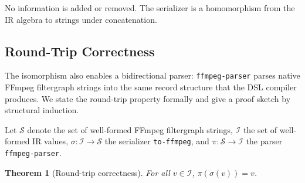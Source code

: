 \documentclass[conference]{IEEEtran}
\newtheorem{theorem}{Theorem}[section]
\begin{document}
No information is added or removed. The serializer is a homomorphism from the IR algebra to strings under concatenation.

\subsection{Round-Trip Correctness}

The isomorphism also enables a bidirectional parser: \texttt{ffmpeg-parser} parses native FFmpeg filtergraph strings into the same record structure that the DSL compiler produces. We state the round-trip property formally and give a proof sketch by structural induction.

Let $\mathcal{S}$ denote the set of well-formed FFmpeg filtergraph strings, $\mathcal{I}$ the set of well-formed IR values, $\sigma : \mathcal{I} \rightarrow \mathcal{S}$ the serializer \texttt{to-ffmpeg}, and $\pi : \mathcal{S} \rightarrow \mathcal{I}$ the parser \texttt{ffmpeg-parser}.

\begin{theorem}[Round-trip correctness]
For all $v \in \mathcal{I}$, $\pi(\sigma(v)) = v$.
\end{theorem}
\end{document}
